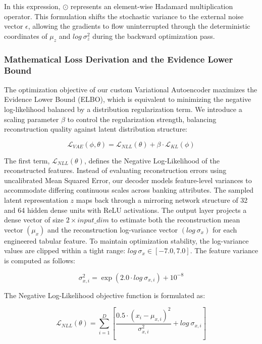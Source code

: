 \documentclass[11pt,a4paper]{report}
\begin{document}
In this expression, $\odot$ represents an element-wise Hadamard multiplication operator. This formulation shifts the stochastic variance to the external noise vector $\epsilon$, allowing the gradients to flow uninterrupted through the deterministic coordinates of $\mu_{z}$ and $log~\sigma_{z}^{2}$ during the backward optimization pass.

\subsubsection*{Mathematical Loss Derivation and the Evidence Lower Bound}
The optimization objective of our custom Variational Autoencoder maximizes the Evidence Lower Bound (ELBO), which is equivalent to minimizing the negative log-likelihood balanced by a distribution regularization term. We introduce a scaling parameter $\beta$ to control the regularization strength, balancing reconstruction quality against latent distribution structure:

\begin{equation}
\mathcal{L}_{VAE}(\phi,\theta)=\mathcal{L}_{NLL}(\theta)+\beta\cdot\mathcal{L}_{KL}(\phi)
\end{equation}

The first term, $\mathcal{L}_{NLL}(\theta)$, defines the Negative Log-Likelihood of the reconstructed features. Instead of evaluating reconstruction errors using uncalibrated Mean Squared Error, our decoder models feature-level variances to accommodate differing continuous scales across banking attributes. The sampled latent representation $z$ maps back through a mirroring network structure of 32 and 64 hidden dense units with ReLU activations. The output layer projects a dense vector of size $2\times input\_dim$ to estimate both the reconstruction mean vector $(\mu_{x})$ and the reconstruction log-variance vector $(log~\sigma_{x})$ for each engineered tabular feature. To maintain optimization stability, the log-variance values are clipped within a tight range: $log~\sigma_{x}\in[-7.0,7.0]$. The feature variance is computed as follows:

\begin{equation}
\sigma_{x,i}^{2}=\exp(2.0\cdot log~\sigma_{x,i})+10^{-8}
\end{equation}

The Negative Log-Likelihood objective function is formulated as:

\begin{equation}
\mathcal{L}_{NLL}(\theta)=\sum_{i=1}^{D}\left[\frac{0.5\cdot(x_{i}-\mu_{x,i})^{2}}{\sigma_{x,i}^{2}}+log~\sigma_{x,i}\right]
\end{equation}
\end{document}
